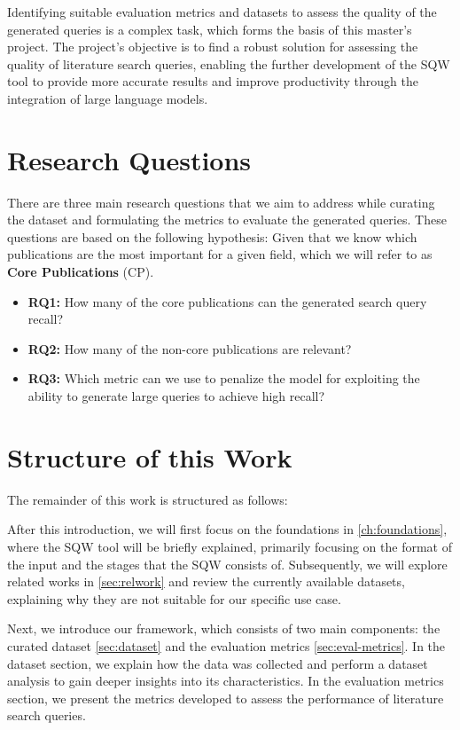 Identifying suitable evaluation metrics and datasets to assess the quality of the generated queries is a complex task, which forms the basis of this master's project. The project’s objective is to find a robust solution for assessing the quality of literature search queries, enabling the further development of the SQW tool to provide more accurate results and improve productivity through the integration of large language models.


\section{Research Questions}\label{sec:researchQuestions}

There are three main research questions that we aim to address while curating the dataset and formulating the metrics to evaluate the generated queries. These questions are based on the following hypothesis: Given that we know which publications are the most important for a given field, which we will refer to as \textbf{Core Publications} (CP).

\begin{itemize}
	\item \textbf{RQ1:} How many of the core publications can the generated search query recall?
	\item \textbf{RQ2:} How many of the non-core publications are relevant?
	\item \textbf{RQ3:} Which metric can we use to penalize the model for exploiting the ability to generate large queries to achieve high recall?
\end{itemize}



\section{Structure of this Work}\label{sec:structure}
The remainder of this work is structured as follows:

After this introduction, we will first focus on the foundations in \autoref{ch:foundations}, where the SQW tool will be briefly explained, primarily focusing on the format of the input and the stages that the SQW consists of. Subsequently, we will explore related works in \autoref{sec:relwork} and review the currently available datasets, explaining why they are not suitable for our specific use case.

Next, we introduce our framework, which consists of two main components: the curated dataset \autoref{sec:dataset} and the evaluation metrics \autoref{sec:eval-metrics}. In the dataset section, we explain how the data was collected and perform a dataset analysis to gain deeper insights into its characteristics. In the evaluation metrics section, we present the metrics developed to assess the performance of literature search queries.

